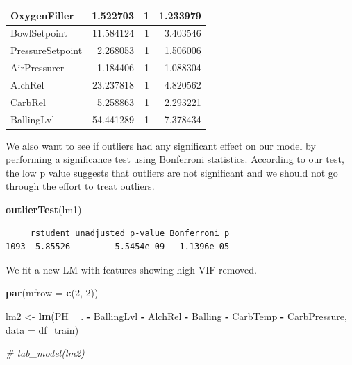 \documentclass[]{report}
\newenvironment{Shaded}{\begin{snugshade}}{\end{snugshade}}
\newcommand{\CommentTok}[1]{\textcolor[rgb]{0.56,0.35,0.01}{\textit{#1}}}
\newcommand{\DataTypeTok}[1]{\textcolor[rgb]{0.13,0.29,0.53}{#1}}
\newcommand{\DecValTok}[1]{\textcolor[rgb]{0.00,0.00,0.81}{#1}}
\newcommand{\KeywordTok}[1]{\textcolor[rgb]{0.13,0.29,0.53}{\textbf{#1}}}
\newcommand{\NormalTok}[1]{#1}
\newcommand{\OperatorTok}[1]{\textcolor[rgb]{0.81,0.36,0.00}{\textbf{#1}}}
\newcommand{\StringTok}[1]{\textcolor[rgb]{0.31,0.60,0.02}{#1}}
\begin{document}
\begin{table}[H]
\begin{tabular}[t]{l|r|r|r}
\hline
\rowcolor{gray!6}  OxygenFiller & 1.522703 & 1 & 1.233979\\
\hline
BowlSetpoint & 11.584124 & 1 & 3.403546\\
\hline
\rowcolor{gray!6}  PressureSetpoint & 2.268053 & 1 & 1.506006\\
\hline
AirPressurer & 1.184406 & 1 & 1.088304\\
\hline
\rowcolor{gray!6}  AlchRel & 23.237818 & 1 & 4.820562\\
\hline
CarbRel & 5.258863 & 1 & 2.293221\\
\hline
\rowcolor{gray!6}  BallingLvl & 54.441289 & 1 & 7.378434\\
\hline
\end{tabular}
\end{table}

We also want to see if outliers had any significant effect on our model
by performing a significance test using Bonferroni statistics. According
to our test, the low p value suggests that outliers are not significant
and we should not go through the effort to treat outliers.

\begin{Shaded}
\begin{Highlighting}[]
\KeywordTok{outlierTest}\NormalTok{(lm1)}
\end{Highlighting}
\end{Shaded}

\begin{verbatim}
     rstudent unadjusted p-value Bonferroni p
1093  5.85526         5.5454e-09   1.1396e-05
\end{verbatim}

We fit a new LM with features showing high VIF removed.

\begin{Shaded}
\begin{Highlighting}[]
\KeywordTok{par}\NormalTok{(}\DataTypeTok{mfrow =} \KeywordTok{c}\NormalTok{(}\DecValTok{2}\NormalTok{, }\DecValTok{2}\NormalTok{))}

\NormalTok{lm2 <-}\StringTok{ }\KeywordTok{lm}\NormalTok{(PH }\OperatorTok{~}\StringTok{ }\NormalTok{. }\OperatorTok{-}\StringTok{ }\NormalTok{BallingLvl }\OperatorTok{-}\StringTok{ }\NormalTok{AlchRel }\OperatorTok{-}\StringTok{ }\NormalTok{Balling }\OperatorTok{-}\StringTok{ }\NormalTok{CarbTemp }\OperatorTok{-}\StringTok{ }
\StringTok{    }\NormalTok{CarbPressure, }\DataTypeTok{data =}\NormalTok{ df_train)}

\CommentTok{# tab_model(lm2)}
\end{Highlighting}
\end{Shaded}
\end{document}

